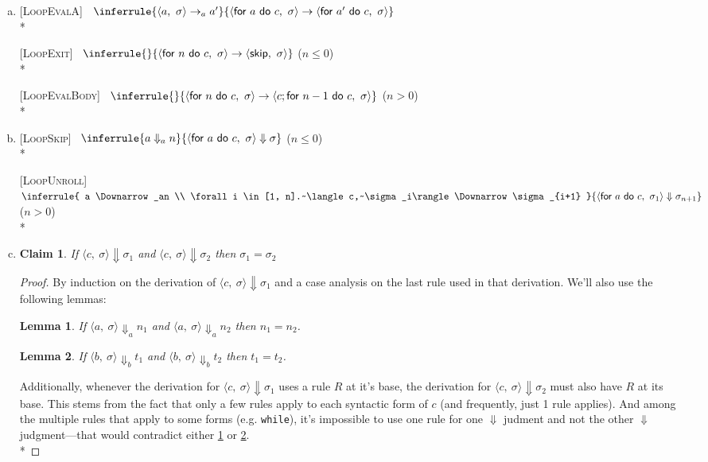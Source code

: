 \documentclass[10pt]{article}
\newcommand{\stepsA}{\rightarrow_a}
\newcommand{\steps}{\rightarrow}
\newcommand{\for}[2]{\textsf{for}~#1~\textsf{do}~#2}
\newcommand{\config}[2]{\langle#1,~#2\rangle}
\newcommand{\impSkip}{\textsf{skip}}
\newcommand{\bigStepsA}{\Downarrow_a}
\newcommand{\bigStepsB}{\Downarrow_b}
\newcommand{\bigSteps}{\Downarrow}
\newcommand{\Rule}[3]{
  [\textsc{#1}]~
  \label{rule:#1}
  \hfill
  \ensuremath{\inferrule{#2}{#3}}
  \hfill
}
\newcommand{\RuleWithCondition}[4]{
  [\textsc{#1}]~
  \label{rule:#1}
  \hfill
  \ensuremath{\inferrule{#2}{#3}}
  (#4)
  \hfill
}
\newtheorem{claim}{Claim}[section]
\newtheorem{lemma}{Lemma}[claim]
\begin{document}
\begin{enumerate}[(a)]
  \item
  \Rule{LoopEvalA}{
    \config{a}{\sigma} \stepsA a'
  }{
    \config{\for{a}{c}}{\sigma} \steps \config{\for{a'}{c}}{\sigma}
  } \\*

  \RuleWithCondition{LoopExit}{}{
    \config{\for n c}{\sigma} \steps \config{\impSkip}{\sigma}
  }{$n \leq 0$} \\*

  \RuleWithCondition{LoopEvalBody}{}{
    \config{\for n c}{\sigma} \steps \config{c; \for{n - 1}{c}}{\sigma}
  }{$n > 0$} \\*

  \item
  \RuleWithCondition{LoopSkip}{
    a \bigStepsA n
  }{
    \config{\for a c}{\sigma} \bigSteps \sigma
  }{$n \leq 0$} \\*

  \RuleWithCondition{LoopUnroll}{
    a \bigStepsA n \\
    \forall i \in [1, n].~\config{c}{\sigma_i} \bigSteps \sigma_{i+1}
  }{
    \config{\for a c}{\sigma_1} \bigSteps \sigma_{n+1}
  }{$n > 0$} \\*

  \item
  \begin{claim} \label{claimFour}
    If   $\config{c}{\sigma} \bigSteps \sigma_1$
    and  $\config{c}{\sigma} \bigSteps \sigma_2$
    then $\sigma_1 = \sigma_2$
  \end{claim}

  \begin{proof} By induction on the derivation of $\config{c}{\sigma} \bigSteps
    \sigma_1$ and a case analysis on the last rule used in that derivation.
    We'll also use the following lemmas:

    \begin{lemma} \label{evalA}
      If   $\config{a}{\sigma} \bigStepsA n_1$
      and  $\config{a}{\sigma} \bigStepsA n_2$
      then $n_1 = n_2$.
    \end{lemma}

    \begin{lemma} \label{evalB}
      If   $\config{b}{\sigma} \bigStepsB t_1$
      and  $\config{b}{\sigma} \bigStepsB t_2$
      then $t_1 = t_2$.
    \end{lemma}

    Additionally, whenever the derivation for $\config{c}{\sigma} \bigSteps
    \sigma_1$ uses a rule $R$ at it's base, the
    derivation for $\config{c}{\sigma} \bigSteps \sigma_2$ must also have $R$
    at its base. This stems from the fact that only a few rules apply to each
    syntactic form of $c$ (and frequently, just 1 rule applies). And among the
    multiple rules that apply to some forms (e.g. {\tt while}), it's impossible
    to use one rule for one $\bigSteps$ judment and not the other $\bigSteps$
    judgment---that would
    contradict either \ref{evalA} or \ref{evalB}. \\*


\end{proof}
\end{enumerate}
\end{document}
